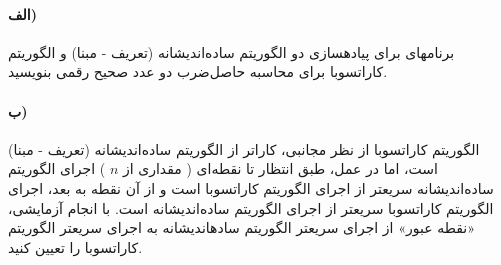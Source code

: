 \documentclass[]{article}
\begin{document}
\paragraph[1.1]{الف)}
برنامهای برای پیادهسازی دو الگوریتم ساده‌اندیشانه (تعریف - مبنا) و الگوریتم کاراتسوبا برای محاسبه حاصل‌ضرب دو عدد صحیح  رقمی بنویسید.

\paragraph[1.2]{ب)}
الگوریتم کاراتسوبا از نظر مجانبی، کاراتر از الگوریتم ساده‌اندیشانه (تعریف - مبنا) است،
اما در عمل، طبق انتظار تا نقطه‌ای ( مقداری از $n$ ) اجرای الگوریتم ساده‌اندیشانه سریعتر از اجرای الگوریتم کاراتسوبا است و از آن نقطه به بعد،
اجرای الگوریتم کاراتسوبا سریعتر از اجرای الگوریتم ساده‌اندیشانه است.
با انجام آزمایشی، «نقطه عبور» از اجرای سریعتر الگوریتم سادهاندیشانه به اجرای سریعتر الگوریتم کاراتسوبا را تعیین کنید. 
\end{document}
